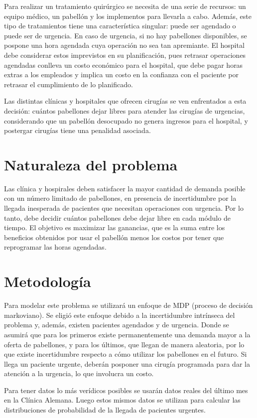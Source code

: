 \documentclass[letterpaper,10pt]{article}
\begin{document}
Para realizar un tratamiento quirúrgico se necesita de una serie de recursos: un equipo médico, un pabellón y los implementos para llevarla a cabo. Además, este tipo de tratamientos tiene una característica singular: puede ser agendado o puede ser de urgencia. En caso de urgencia, si no hay pabellones disponibles, se pospone una hora agendada cuya operación no sea tan apremiante. El hospital debe considerar estos imprevistos en su planificación, pues retrasar operaciones agendadas conlleva un costo económico para el hospital, que debe pagar horas extras a los empleados y implica un costo en la confianza con el paciente por retrasar el cumplimiento de lo planificado.

Las distintas clínicas y hospitales que ofrecen cirugías se ven enfrentados a esta decisión: cuántos pabellones dejar libres para atender las cirugías de urgencias, considerando que un pabellón desocupado no genera ingresos para el hospital, y postergar cirugías tiene una penalidad asociada.

\section*{Naturaleza del problema}
Las clínica y hospirales deben satisfacer la mayor cantidad de demanda posible con un número limitado de pabellones, en presencia de incertidumbre por la llegada inesperada de pacientes que necesitan operaciones con urgencia. Por lo tanto, debe decidir cuántos pabellones debe dejar libre en cada módulo de tiempo. El objetivo es maximizar las ganancias, que es la suma entre los beneficios obtenidos por usar el pabellón menos los costos por tener que reprogramar las horas agendadas. 

\section*{Metodología}
Para modelar este problema se utilizará un enfoque de MDP (proceso de decisión markoviano). Se eligió este enfoque debido a la incertidumbre intrínseca del problema y, además, existen pacientes agendados y de urgencia. Donde se asumirá que para los primeros existe permanentemente una demanda mayor a la oferta de pabellones, y para los últimos, que llegan de manera aleatoria, por lo que existe incertidumbre respecto a cómo utilizar los pabellones en el futuro. Si llega un paciente urgente, deberán posponer una cirugía programada para dar la atención a la urgencia, lo que involucra un costo.

Para tener datos lo más verídicos posibles se usarán datos reales del último mes en la Clínica Alemana. Luego estos mismos datos se utilizan para calcular las distribuciones de probabilidad de la llegada de pacientes urgentes.
\end{document}
